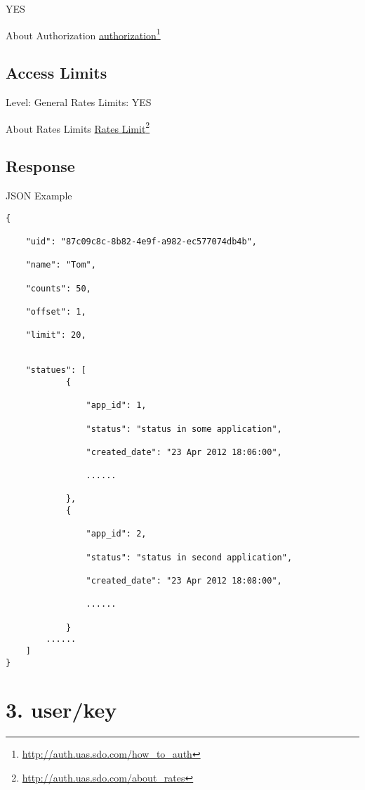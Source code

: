 YES

About Authorization \href{http://auth.uas.sdo.com/how_to_auth}{authorization}\footnote{\href{http://auth.uas.sdo.com/how_to_auth}{http:/\slash auth.uas.sdo.com\slash how\_to\_auth}}

\section{Access Limits}
\label{accesslimits}

Level: General
Rates Limits: YES

About Rates Limits \href{http://auth.uas.sdo.com/about_rates}{Rates Limit}\footnote{\href{http://auth.uas.sdo.com/about_rates}{http:/\slash auth.uas.sdo.com\slash about\_rates}}

\section{Response}
\label{response}

JSON Example

\begin{verbatim}
{

    "uid": "87c09c8c-8b82-4e9f-a982-ec577074db4b",

    "name": "Tom",  

    "counts": 50,  

    "offset": 1,  

    "limit": 20,  


    "statues": [
            {

                "app_id": 1,

                "status": "status in some application",

                "created_date": "23 Apr 2012 18:06:00",

                ......

            },
            {

                "app_id": 2,

                "status": "status in second application",

                "created_date": "23 Apr 2012 18:08:00",

                ......

            }
        ......
    ]
}
\end{verbatim}


\chapter{3. user\slash key}
\label{userkey}


